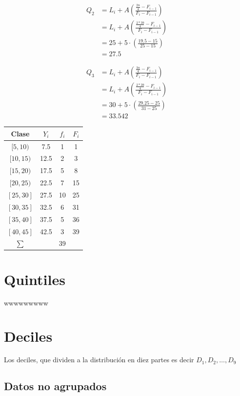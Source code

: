 \documentclass[
  11pt,
]{krantz}
\theoremstyle{definition}
\theoremstyle{definition}
\theoremstyle{definition}
\theoremstyle{definition}
\theoremstyle{remark}
\begin{document}
\[
\begin{aligned}
Q_2&=L_i+ A\left(\frac{\frac{2n}{4}-F_{i-1}}{F_i-F_{i-1}}\right)\\
&=L_i+ A\left(\frac{\frac{2*39}{4}-F_{i-1}}{F_i-F_{i-1}}\right)\\
&=25+ 5\cdot\left(\frac{19.5 -15}{25-15}\right)\\
&= 27.5
\end{aligned}
\]

\[
\begin{aligned}
Q_3&=L_i+ A\left(\frac{\frac{3n}{4}-F_{i-1}}{F_i-F_{i-1}}\right)\\
&=L_i+ A\left(\frac{\frac{2*39}{4}-F_{i-1}}{F_i-F_{i-1}}\right)\\
&=30+ 5\cdot\left(\frac{29.25 -25}{31-25}\right)\\
&= 33.542
\end{aligned}
\]

\begin{longtable}[]{@{}cccc@{}}
\toprule
Clase & \(Y_i\) & \(f_i\) & \(F_i\) \\
\midrule
\endhead
\([5,10)\) & 7.5 & 1 & 1 \\
\([10,15)\) & 12.5 & 2 & 3 \\
\([15,20)\) & 17.5 & 5 & 8 \\
\([20,25)\) & 22.5 & 7 & 15 \\
\([25,30]\) & 27.5 & 10 & 25 \\
\([30,35]\) & 32.5 & 6 & 31 \\
\([35,40]\) & 37.5 & 5 & 36 \\
\([40,45]\) & 42.5 & 3 & 39 \\
\(\sum\) & & 39 & \\
\bottomrule
\end{longtable}

\hypertarget{quintiles}{%
\section{Quintiles}\label{quintiles}}

wwwwwwwww

\hypertarget{deciles}{%
\section{Deciles}\label{deciles}}

Los deciles, que dividen a la distribución en diez partes es decir \(D_1, D_2,\ldots, D_9\)

\hypertarget{datos-no-agrupados-1}{%
\subsection{Datos no agrupados}\label{datos-no-agrupados-1}}
\end{document}
